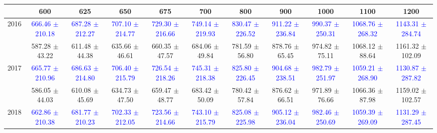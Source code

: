 {
\renewcommand{\arraystretch}{1.0}
\begin{center}
\begin{small}
\begin{tabular}{ccccccccccc}
\hline\hline
 & 600 & 625 & 650 & 675 & 700 & 800 & 900 & 1000 & 1100 & 1200 \\
\hline
\multirow{2}{*}{2016} & \textcolor{blue}{666.46 $\pm$ 210.18} & \textcolor{blue}{687.28 $\pm$ 212.27} & \textcolor{blue}{707.10 $\pm$ 214.77} & \textcolor{blue}{729.30 $\pm$ 216.66} & \textcolor{blue}{749.14 $\pm$ 219.93} & \textcolor{blue}{830.47 $\pm$ 226.52} & \textcolor{blue}{911.22 $\pm$ 236.84} & \textcolor{blue}{990.37 $\pm$ 250.31} & \textcolor{blue}{1068.76 $\pm$ 268.32} & \textcolor{blue}{1143.31 $\pm$ 284.74} \\
 & \textcolor{myred}{587.28 $\pm$ 43.22} & \textcolor{myred}{611.48 $\pm$ 44.38} & \textcolor{myred}{635.66 $\pm$ 46.61} & \textcolor{myred}{660.35 $\pm$ 47.57} & \textcolor{myred}{684.06 $\pm$ 49.84} & \textcolor{myred}{781.59 $\pm$ 56.80} & \textcolor{myred}{878.76 $\pm$ 65.45} & \textcolor{myred}{974.82 $\pm$ 75.11} & \textcolor{myred}{1068.12 $\pm$ 88.64} & \textcolor{myred}{1161.32 $\pm$ 102.09} \\
\hline
\multirow{2}{*}{2017} & \textcolor{blue}{665.77 $\pm$ 210.96} & \textcolor{blue}{686.63 $\pm$ 214.80} & \textcolor{blue}{706.40 $\pm$ 215.79} & \textcolor{blue}{726.54 $\pm$ 218.26} & \textcolor{blue}{745.31 $\pm$ 218.38} & \textcolor{blue}{825.80 $\pm$ 226.45} & \textcolor{blue}{904.68 $\pm$ 238.51} & \textcolor{blue}{982.79 $\pm$ 251.97} & \textcolor{blue}{1059.21 $\pm$ 268.90} & \textcolor{blue}{1130.87 $\pm$ 287.82} \\
 & \textcolor{myred}{586.05 $\pm$ 44.03} & \textcolor{myred}{610.08 $\pm$ 45.69} & \textcolor{myred}{634.73 $\pm$ 47.50} & \textcolor{myred}{659.47 $\pm$ 48.77} & \textcolor{myred}{683.42 $\pm$ 50.09} & \textcolor{myred}{780.42 $\pm$ 57.84} & \textcolor{myred}{876.62 $\pm$ 66.51} & \textcolor{myred}{971.89 $\pm$ 76.66} & \textcolor{myred}{1066.36 $\pm$ 87.98} & \textcolor{myred}{1159.02 $\pm$ 102.57} \\
\hline
\multirow{2}{*}{2018} & \textcolor{blue}{662.86 $\pm$ 210.38} & \textcolor{blue}{681.77 $\pm$ 210.23} & \textcolor{blue}{702.33 $\pm$ 212.05} & \textcolor{blue}{723.56 $\pm$ 214.66} & \textcolor{blue}{743.10 $\pm$ 215.79} & \textcolor{blue}{825.08 $\pm$ 225.98} & \textcolor{blue}{905.12 $\pm$ 236.04} & \textcolor{blue}{982.46 $\pm$ 250.69} & \textcolor{blue}{1059.39 $\pm$ 269.09} & \textcolor{blue}{1131.29 $\pm$ 287.45} \\

\end{tabular}
\end{small}
\end{center}}
